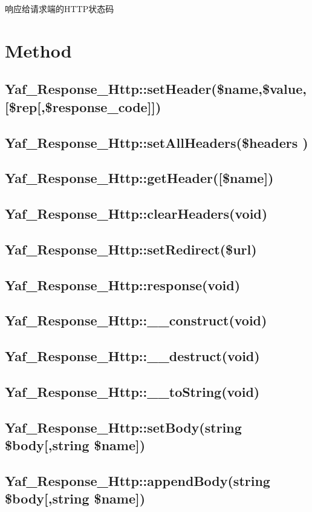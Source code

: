 响应给请求端的HTTP状态码


\section{Method}


\subsection{Yaf\_Response\_Http::setHeader(\$name,\$value,[\$rep[,\$response\_code]])}
\subsection{Yaf\_Response\_Http::setAllHeaders(\$headers )}
\subsection{Yaf\_Response\_Http::getHeader([\$name])}
\subsection{Yaf\_Response\_Http::clearHeaders(void)}
\subsection{Yaf\_Response\_Http::setRedirect(\$url)}

\subsection{Yaf\_Response\_Http::response(void)}
\subsection{Yaf\_Response\_Http::\_\_construct(void)}
\subsection{Yaf\_Response\_Http::\_\_destruct(void)}
\subsection{Yaf\_Response\_Http::\_\_toString(void)}
\subsection{Yaf\_Response\_Http::setBody(string \$body[,string \$name])}
\subsection{Yaf\_Response\_Http::appendBody(string \$body[,string \$name])}
